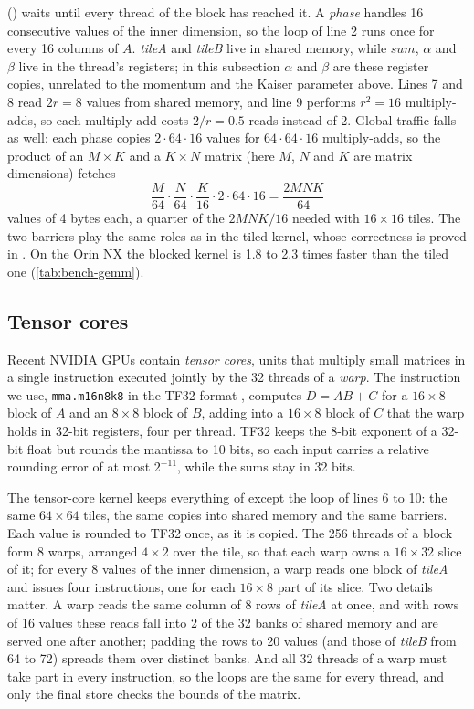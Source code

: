 () waits until every thread of the block has reached it. A
\emph{phase} handles 16 consecutive values of the inner dimension, so the
loop of line 2 runs once for every 16 columns of $A$. \textit{tileA} and
\textit{tileB} live in shared memory, while $\mathit{sum}$, $\alpha$ and $\beta$
live in the thread's registers; in this subsection $\alpha$ and $\beta$ are
these register copies, unrelated to the momentum and the Kaiser parameter
above. Lines 7 and 8 read $2r = 8$ values from shared memory, and line 9 performs $r^2 = 16$
multiply-adds, so each multiply-add costs $2/r = 0.5$ reads instead of 2.
Global traffic falls as well: each phase copies $2 \cdot 64 \cdot 16$ values for
$64 \cdot 64 \cdot 16$ multiply-adds, so the product of an $M \times K$ and a
$K \times N$ matrix (here $M$, $N$ and $K$ are matrix dimensions) fetches
\[
\frac{M}{64} \cdot \frac{N}{64} \cdot \frac{K}{16} \cdot 2 \cdot 64 \cdot 16 = \frac{2MNK}{64}
\]
values of 4 bytes each, a quarter of the $2MNK/16$ needed with $16 \times 16$
tiles. The two
barriers play the same roles as in the tiled kernel, whose correctness is
proved in \cite{pathak2026tiled}. On the Orin NX the blocked kernel is 1.8 to
2.3 times faster than the tiled one (\cref{tab:bench-gemm}).

\subsection{Tensor cores}
\label{sec:tensor-cores}

Recent NVIDIA GPUs contain \emph{tensor cores}, units that multiply small
matrices in a single instruction executed jointly by the 32 threads of a
\emph{warp}. The instruction we use, \texttt{mma.m16n8k8} in the TF32 format
\cite{nvidia2026ptx}, computes $D = AB + C$ for a $16 \times 8$ block of $A$
and an $8 \times 8$ block of $B$, adding into a $16 \times 8$ block of $C$ that
the warp holds in 32-bit registers, four per thread. TF32 keeps the 8-bit
exponent of a 32-bit float but rounds the mantissa to 10 bits, so each input
carries a relative rounding error of at most $2^{-11}$, while the sums stay in
32 bits.

The tensor-core kernel keeps everything of  except the
loop of lines 6 to 10: the same $64 \times 64$ tiles, the same copies into
shared memory and the same barriers. Each value is rounded to TF32 once, as it
is copied. The 256 threads of a block form 8 warps, arranged $4 \times 2$ over
the tile, so that each warp owns a $16 \times 32$ slice of it; for every 8
values of the inner dimension, a warp reads one block of \textit{tileA} and
issues four instructions, one for each $16 \times 8$ part of its slice. Two
details matter. A warp reads the same column of 8 rows of \textit{tileA} at
once, and with rows of 16 values these reads fall into 2 of the 32 banks of
shared memory and are served one after another; padding the rows to 20 values
(and those of \textit{tileB} from 64 to 72) spreads them over distinct banks.
And all 32 threads of a warp must take part in every instruction, so the loops
are the same for every thread, and only the final store checks the bounds of
the matrix.

